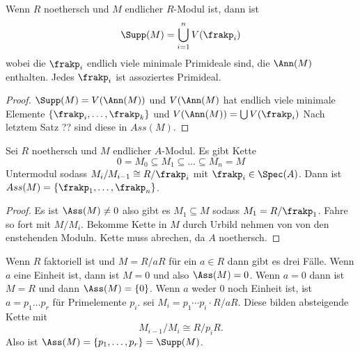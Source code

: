 \begin{Kor} Wenn \(R\) noethersch und \(M\) endlicher \(R\)-Modul ist, dann ist \[\Supp(M)=\bigcup_{i=1}^nV(\frakp_i)\]
	wobei die \(\frakp_i\) endlich viele minimale Primideale sind, die \(\Ann(M)\) enthalten. Jedes \(\frakp_i\) ist assoziertes
	Primideal.
	
\end{Kor}
\begin{proof}
	\(\Supp(M)=V(\Ann(M))\) und \(V(\Ann(M)\) hat endlich viele minimale Elemente \(\{\frakp_i,\dots,\frakp_k\}\)
	und \(V(\Ann(M))=\bigcup V(\frakp_i)\) Nach letztem Satz ?? sind diese in \(Ass(M)\).
\end{proof}
\begin{Satz} Sei \( R \) noethersch und \(M\) endlicher \(A\)-Modul. Es gibt Kette
	\[0=M_0\subseteq M_1\subseteq\dots\subseteq M_n=M\] Untermodul sodass
	\(M_i/M_{i-1} \cong R/\frakp_i \) mit \(\frakp_i\in\Spec(A)\).
	Dann ist \(Ass(M)=\{\frakp_1,\dots,\frakp_n\}\).
	
\end{Satz}
\begin{proof}
	Es ist \(\Ass(M)\neq 0\) also gibt es \(M_1\subseteq M\) sodass \(M_1=R/\frakp_1\).
	Fahre so fort mit \(M/M_i\).
	Bekomme Kette in \(M\) durch Urbild nehmen von von den enstehenden Moduln. Kette muss abrechen, da \(A\) noethersch.
\end{proof}
\begin{Bsp}
	Wenn \(R\) faktoriell ist und \(M=R/aR\) für ein \(a\in R\) dann gibt es drei Fälle. 
	Wenn \(a\) eine Einheit ist, dann ist \(M=0\) und also \(\Ass(M)=0\). Wenn \(a=0\) dann ist
	\(M=R\) und dann \(\Ass(M)=\{0\}\).
	Wenn \(a\) weder \(0\) noch Einheit ist, ist \(a=p_1\dots p_r\) für Primelemente \(p_i\).
	sei \(M_i=p_1\cdots p_i\cdot R/aR\). Diese bilden absteigende Kette mit 
	\[M_{i-1}/M_i\cong R/p_iR.\]
	Also ist \(\Ass(M)=\{p_1,\dots,p_r\}=\Supp(M)\).
\end{Bsp}
